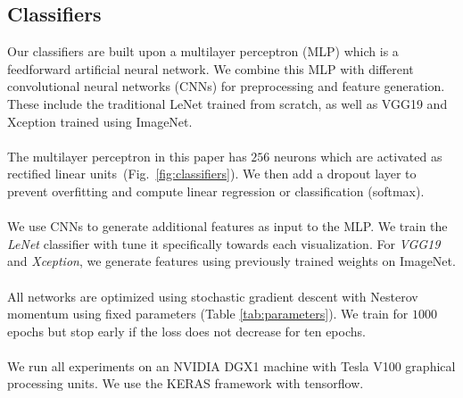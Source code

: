 \subsection{Classifiers}

Our classifiers are built upon a multilayer perceptron (MLP) which is a feedforward artificial neural network. We combine this MLP with different convolutional neural networks (CNNs) for preprocessing and feature generation. These include the traditional LeNet trained from scratch, as well as VGG19 and Xception trained using ImageNet.
\\~\\
 The multilayer perceptron in this paper has $256$ neurons which are activated as rectified linear units~(Fig.~\ref{fig:classifiers}). We then add a dropout layer to prevent overfitting and compute linear regression or classification (softmax).
\\~\\
 We use CNNs to generate additional features as input to the MLP. We train the \emph{LeNet} classifier with tune it specifically towards each visualization. For \emph{VGG19} and \emph{Xception}, we generate features using previously trained weights on ImageNet.
\\~\\
 All networks are optimized using stochastic gradient descent with Nesterov momentum using fixed parameters (Table \ref{tab:parameters}). We train for $1000$ epochs but stop early if the loss does not decrease for ten epochs.
\\~\\
 We run all experiments on an NVIDIA DGX1 machine with Tesla V100 graphical processing units. We use the KERAS framework with tensorflow.

